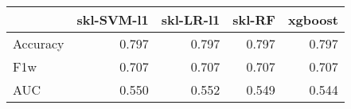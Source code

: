 \begin{tabular}{lrrrr}
\toprule
{} &  skl-SVM-l1 &  skl-LR-l1 &  skl-RF &  xgboost \\
\midrule
Accuracy &       0.797 &      0.797 &   0.797 &    0.797 \\
F1w      &       0.707 &      0.707 &   0.707 &    0.707 \\
AUC      &       0.550 &      0.552 &   0.549 &    0.544 \\
\bottomrule
\end{tabular}
